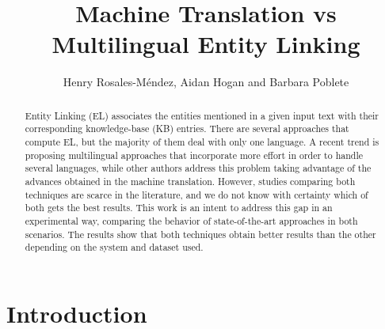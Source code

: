 \documentclass{llncs}
\begin{document}
\title{Machine Translation vs Multilingual Entity Linking}
%
%
\author{Henry Rosales-M\'endez, Aidan Hogan and Barbara Poblete}
%
%
%

\maketitle              %
\begin{abstract}
Entity Linking (EL) associates the entities mentioned in a given input text with their corresponding knowledge-base (KB) entries. There are several approaches that compute EL, but the majority of them deal with only one language. A recent trend is proposing multilingual approaches that incorporate more effort in order to handle several languages, while other authors address this problem taking advantage of the advances obtained in the machine translation. However, studies comparing both techniques are scarce in the literature, and we do not know with certainty which of both gets the best results. 
This work is an intent to address this gap in an experimental way, comparing the behavior of state-of-the-art approaches in both scenarios. The results show that both techniques obtain better results than the other depending on the system and dataset used.
\end{abstract}




\section{Introduction}
\label{sec:intro}
\end{document}
